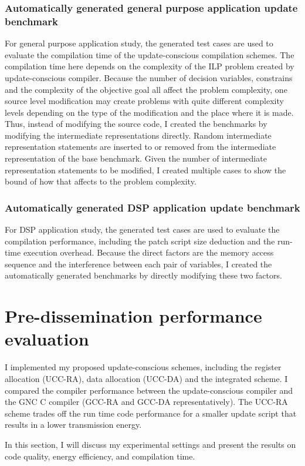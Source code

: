 \subsubsection{Automatically generated general purpose application update benchmark}
For general purpose application study, 
the generated test cases are used to evaluate the compilation time of the update-conscious compilation schemes. The compilation time here depends on the complexity of the
ILP problem created by update-conscious compiler.  
Because the number of decision variables, constrains and the complexity of
the objective goal all affect the problem complexity, one source level modification may create problems with
quite different complexity levels depending on the type of the modification
and the place where it is made. 
Thus, instead of modifying the source code, I created the benchmarks
by modifying the intermediate representations directly.
Random intermediate representation statements are inserted to or removed from the 
intermediate representation of the base benchmark.
Given the number of intermediate representation statements to be modified,
I created multiple cases to show the bound of how that affects to the problem complexity.

\subsubsection{Automatically generated DSP application update benchmark}
For DSP application study, the generated test cases are used to evaluate
the compilation performance, including the patch script size deduction and
the run-time execution overhead.
Because the direct factors are the memory access sequence and the interference
between each pair of variables, I created the automatically generated 
benchmarks by directly modifying these two factors.

\section{Pre-dissemination performance evaluation}
I implemented my proposed update-conscious schemes, including the register allocation
(UCC-RA), data allocation (UCC-DA) and the integrated scheme.
I compared the compiler performance between the update-conscious compiler and 
the GNC C compiler (GCC-RA and GCC-DA representatively). 
The UCC-RA scheme trades off the run time code performance for a smaller update script
that results in a lower transmission energy.

In this
section, I will discuss my experimental settings and present the results
on code quality, energy efficiency, and compilation time.

